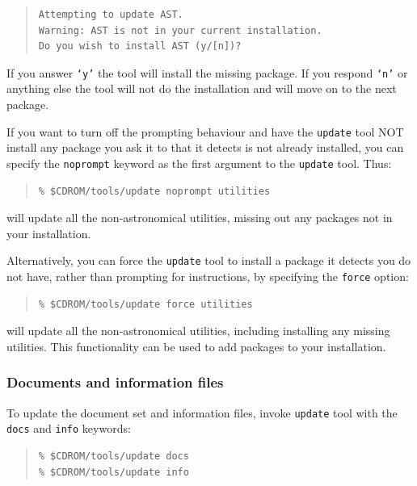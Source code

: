 \documentclass[twoside,11pt]{article}
\newcommand{\xlabel}[1]{}
\renewcommand{\_}{\texttt{\symbol{95}}}
\begin{document}
\begin{quote}
\begin{verbatim}
Attempting to update AST.
Warning: AST is not in your current installation.
Do you wish to install AST (y/[n])?
\end{verbatim}
\end{quote}

If you answer \texttt{`y'} the tool will install the missing package.
If you respond \texttt{`n'} or anything else the tool will not do the
installation and will move on to the next package.

If you want to turn off the prompting behaviour and have the
\texttt{update} tool NOT install any package you ask it to that it
detects is not already installed, you can specify the \texttt{noprompt}
keyword as the first argument to the \texttt{update} tool.  Thus:

\begin{quote}
\begin{verbatim}
% $CDROM/tools/update noprompt utilities
\end{verbatim}
\end{quote}

will update all the non-astronomical utilities, missing out any
packages not in your installation.

Alternatively, you can force the \texttt{update} tool to install a
package it detects you do not have, rather than prompting for
instructions, by specifying the \texttt{force} option:

\begin{quote}
\begin{verbatim}
% $CDROM/tools/update force utilities
\end{verbatim}
\end{quote}

will update all the non-astronomical utilities, including installing
any missing utilities.  This functionality can be used to add packages
to your installation.

\subsubsection{\xlabel{documents_and_information_files}Documents and information files}
\label{documents_and_information_files}

To update the document set and information files, invoke \texttt{update} tool
with the \texttt{docs} and \texttt{info} keywords:

\begin{quote}
\begin{verbatim}
% $CDROM/tools/update docs
% $CDROM/tools/update info
\end{verbatim}
\end{quote}
\end{document}
